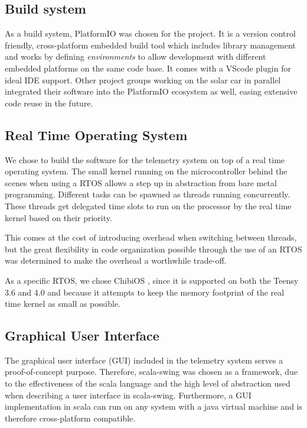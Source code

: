 \documentclass[a4paper,conference]{IEEEtran}
\begin{document}
\subsection{Build system}
As a build system, PlatformIO \cite{platformIO} was chosen for the project. It is a version control friendly, cross-platform embedded build tool which includes library management and works by defining \textit{environments} to allow development with different embedded platforms on the same code base. It comes with a VScode plugin for ideal IDE support. Other project groups working on the solar car in parallel integrated their software into the PlatformIO ecosystem as well, easing extensive code reuse in the future.

\subsection{Real Time Operating System}
We chose to build the software for the telemetry system on top of a real time operating system. The small kernel running on the microcontroller behind the scenes when using a RTOS allows a step up in abstraction from bare metal programming. Different tasks can be spawned as threads running concurrently. These threads get delegated time slots to run on the processor by the real time kernel based on their priority.

This comes at the cost of introducing overhead when switching between threads, but the great flexibility in code organization possible through the use of an RTOS was determined to make the overhead a worthwhile trade-off.

As a specific RTOS, we chose ChibiOS \cite{chibios}, since it is supported on both the Teensy 3.6 and 4.0 and because it attempts to keep the memory footprint of the real time kernel as small as possible.

\subsection{Graphical User Interface} %

The graphical user interface (GUI) included in the telemetry system serves a proof-of-concept purpose. Therefore, scala-swing \cite{scala-swing} was chosen as a framework, due to the effectiveness of the scala language \cite{scala} and the high level of abstraction used when describing a user interface in scala-swing. Furthermore, a GUI implementation in scala can run on any system with a java virtual machine and is therefore cross-platform compatible.
\end{document}
